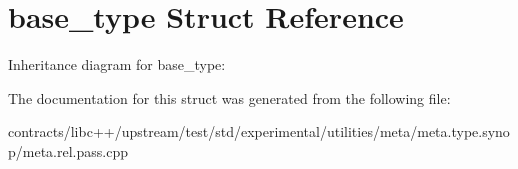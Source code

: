 \hypertarget{structbase__type}{}\section{base\+\_\+type Struct Reference}
\label{structbase__type}


Inheritance diagram for base\+\_\+type\+:


The documentation for this struct was generated from the following file\+:\begin{DoxyCompactItemize}
\item 
contracts/libc++/upstream/test/std/experimental/utilities/meta/meta.\+type.\+synop/meta.\+rel.\+pass.\+cpp\end{DoxyCompactItemize}
